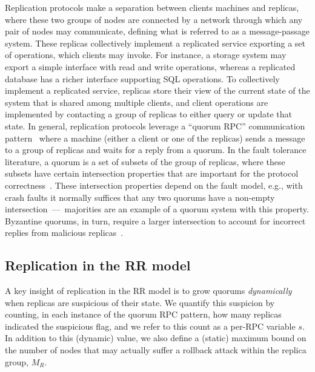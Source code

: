 Replication protocols make a separation between clients machines
and replicas, where these two groups of nodes are connected by a network through which any pair of nodes may communicate, defining what is referred to as a message-passage system.
These replicas collectively implement a
replicated service exporting a set of operations, which clients may invoke.
For instance, a storage system may export a simple interface with read
and write operations, whereas a replicated database has a richer interface
supporting SQL operations.
To collectively implement a replicated service, replicas store their view of the current state of the system that is
shared among multiple clients, and
client operations are implemented by contacting a group of replicas to either query or update that state.
In general, replication protocols leverage a
``quorum RPC'' communication pattern~\cite{Malkhi:Reiter:BQS:98,lorenzo:framework} where a machine (either a client
or one of the replicas) sends a message to a group of replicas and
waits for a reply from a
quorum. In the fault
tolerance literature, a quorum is a set of subsets of the group of replicas,
where these subsets have certain intersection properties that are important
for the protocol correctness~\cite{gifford:quorums}. These intersection properties depend on the
fault model, e.g., with crash faults it normally suffices that any two
quorums have a non-empty intersection~---~majorities are an example of
a quorum system with this property. Byzantine quorums, in turn, require a larger
intersection to account for incorrect replies from malicious replicas~\cite{Malkhi:Reiter:BQS:98}.

\subsection{Replication in the \ac{RR} model}

A key insight of replication in the \ac{RR} model is to grow quorums
\emph{dynamically} when replicas are suspicious of their state.
We quantify this suspicion by counting, in each instance of the
quorum RPC pattern, how many replicas indicated the suspicious
flag, and we refer to this count as a per-RPC variable $s$.
In addition to this (dynamic) value, we also define a (static)
maximum bound on the number of nodes that may actually
suffer a rollback attack within the replica group, $M_R$.

